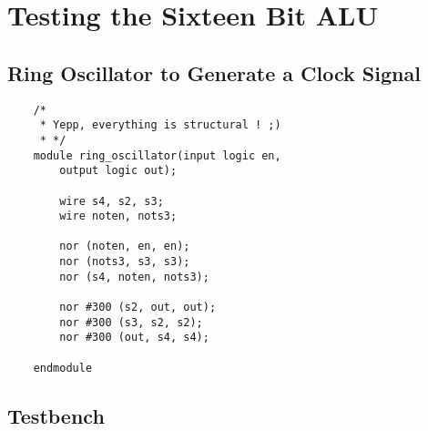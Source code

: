 \documentclass[../main]{subfiles}
\begin{document}
\section{Testing the Sixteen Bit ALU}

\subsection {Ring Oscillator to Generate a Clock Signal}

\begin{verbatim}
    /*
     * Yepp, everything is structural ! ;)
     * */
    module ring_oscillator(input logic en,
        output logic out);

        wire s4, s2, s3;
        wire noten, nots3;

        nor (noten, en, en);
        nor (nots3, s3, s3);
        nor (s4, noten, nots3);

        nor #300 (s2, out, out);
        nor #300 (s3, s2, s2);
        nor #300 (out, s4, s4);

    endmodule
\end{verbatim}


\subsection {Testbench}
\end{document}
